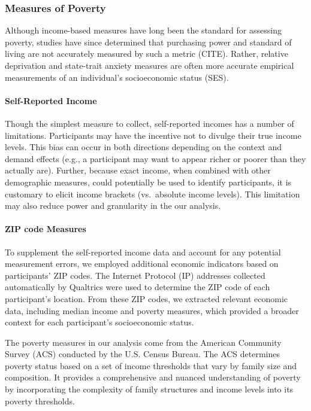\documentclass[
]{article}
\let\oldparagraph\paragraph
\renewcommand{\paragraph}[1]{\oldparagraph{#1}\mbox{}}
\begin{document}
\hypertarget{measures-of-poverty}{%
\subsubsection{Measures of Poverty}\label{measures-of-poverty}}

Although income-based measures have long been the standard for assessing
poverty, studies have since determined that purchasing power and
standard of living are not accurately measured by such a metric (CITE).
Rather, relative deprivation and state-trait anxiety measures are often
more accurate empirical measurements of an individual's socioeconomic
status (SES).

\hypertarget{self-reported-income}{%
\paragraph{Self-Reported Income}\label{self-reported-income}}

Though the simplest measure to collect, self-reported incomes has a
number of limitations. Participants may have the incentive not to
divulge their true income levels. This bias can occur in both directions
depending on the context and demand effects (e.g., a participant may
want to appear richer or poorer than they actually are). Further,
because exact income, when combined with other demographic measures,
could potentially be used to identify participants, it is customary to
elicit income brackets (vs.~absolute income levels). This limitation may
also reduce power and granularity in the our analysis.

\hypertarget{zip-code-measures}{%
\paragraph{ZIP code Measures}\label{zip-code-measures}}

To supplement the self-reported income data and account for any
potential measurement errors, we employed additional economic indicators
based on participants' ZIP codes. The Internet Protocol (IP) addresses
collected automatically by Qualtrics were used to determine the ZIP code
of each participant's location. From these ZIP codes, we extracted
relevant economic data, including median income and poverty measures,
which provided a broader context for each participant's socioeconomic
status.

The poverty measures in our analysis come from the American Community
Survey (ACS) conducted by the U.S. Census Bureau. The ACS determines
poverty status based on a set of income thresholds that vary by family
size and composition. It provides a comprehensive and nuanced
understanding of poverty by incorporating the complexity of family
structures and income levels into its poverty thresholds.
\end{document}
